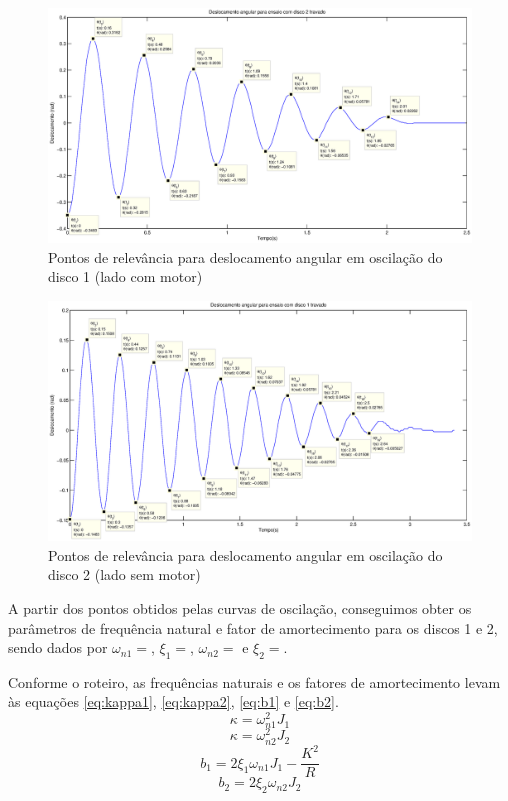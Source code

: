\documentclass{article}
\begin{document}
\begin{figure}[H]
	\centering
	\includegraphics[width=0.8\linewidth]{../disco2travado}
	\caption{Pontos de relevância para deslocamento angular em oscilação do disco 1 (lado com motor)}
	\label{fig:disco2travado}
\end{figure}
\begin{figure}[H]
	\centering
	\includegraphics[width=0.8\linewidth]{../disco1travado}
	\caption{Pontos de relevância para deslocamento angular em oscilação do disco 2 (lado sem motor)}
	\label{fig:disco1travado}
\end{figure}

A partir dos pontos obtidos pelas curvas de oscilação, conseguimos obter os parâmetros de frequência natural e fator de amortecimento para os discos 1 e 2, sendo dados por $\omega_{n1}=%
$, $\xi_1=%
$, $\omega_{n2}=%
$ e $\xi_2=%
$.

Conforme o roteiro\cite{bb:roteiro}, as frequências naturais e os fatores de amortecimento levam às equações \ref{eq:kappa1}, \ref{eq:kappa2}, \ref{eq:b1} e \ref{eq:b2}. 
\begin{equation}
\label{eq:kappa1}
\kappa=\omega_{n1}^2J_1
\end{equation}
\begin{equation}
\label{eq:kappa2}
\kappa=\omega_{n2}^2J_2
\end{equation}
\begin{equation}
\label{eq:b1}
b_1=2\xi_1\omega_{n1}J_1-\frac{K^2}{R}
\end{equation}
\begin{equation}
\label{eq:b2}
b_2=2\xi_2\omega_{n2}J_2
\end{equation}
\end{document}
